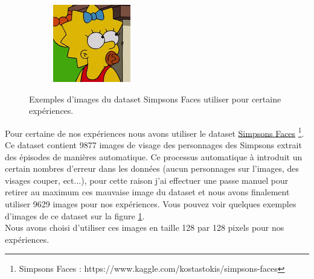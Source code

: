 \documentclass[11pt,francais]{article}
\begin{document}
\begin{figure}[!h]
\begin{subfigure}[b]{0.19\textwidth}
    \end{subfigure}
    \begin{subfigure}[b]{0.19\textwidth}
        \includegraphics[width=\textwidth]{Figures/Simpsons_Dataset/18.png}
    \end{subfigure}
    \caption{Exemples d'images du dataset Simpsons Faces utiliser pour certaine expériences.}
    \label{fig:fig1}
\end{figure}

Pour certaine de nos expériences nous avons utiliser le dataset \href{https://www.kaggle.com/kostastokis/simpsons-faces}{Simpsons Faces} \footnote{\label{note2}Simpsons Faces : https://www.kaggle.com/kostastokis/simpsons-faces}. Ce dataset contient 9877 images de visage des personnages des Simpsons extrait des épisodes de manières automatique. Ce processus  automatique à introduit un certain nombres d'erreur dans les données (aucun personnages sur l'images, des visages couper, ect...), pour cette raison j'ai effectuer une passe manuel pour retirer au maximum ces mauvaise image du dataset et nous avons finalement utiliser 9629 images pour nos expériences. Vous pouvez voir quelques exemples d'images de ce dataset sur la figure \ref{fig:fig1}.\\
Nous avons choisi d'utiliser ces images en taille 128 par 128 pixels pour nos expériences.
\end{document}
